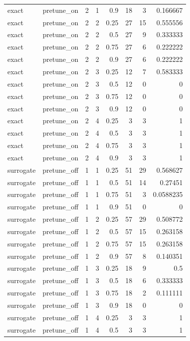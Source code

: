 \begin{table}[htbp]
\begin{tabular}{lrrrrrrr}
exact & pretune\_on & 2 & 1 & 0.9 & 18 & 3 & 0.166667 \\
exact & pretune\_on & 2 & 2 & 0.25 & 27 & 15 & 0.555556 \\
exact & pretune\_on & 2 & 2 & 0.5 & 27 & 9 & 0.333333 \\
exact & pretune\_on & 2 & 2 & 0.75 & 27 & 6 & 0.222222 \\
exact & pretune\_on & 2 & 2 & 0.9 & 27 & 6 & 0.222222 \\
exact & pretune\_on & 2 & 3 & 0.25 & 12 & 7 & 0.583333 \\
exact & pretune\_on & 2 & 3 & 0.5 & 12 & 0 & 0 \\
exact & pretune\_on & 2 & 3 & 0.75 & 12 & 0 & 0 \\
exact & pretune\_on & 2 & 3 & 0.9 & 12 & 0 & 0 \\
exact & pretune\_on & 2 & 4 & 0.25 & 3 & 3 & 1 \\
exact & pretune\_on & 2 & 4 & 0.5 & 3 & 3 & 1 \\
exact & pretune\_on & 2 & 4 & 0.75 & 3 & 3 & 1 \\
exact & pretune\_on & 2 & 4 & 0.9 & 3 & 3 & 1 \\
surrogate & pretune\_off & 1 & 1 & 0.25 & 51 & 29 & 0.568627 \\
surrogate & pretune\_off & 1 & 1 & 0.5 & 51 & 14 & 0.27451 \\
surrogate & pretune\_off & 1 & 1 & 0.75 & 51 & 3 & 0.0588235 \\
surrogate & pretune\_off & 1 & 1 & 0.9 & 51 & 0 & 0 \\
surrogate & pretune\_off & 1 & 2 & 0.25 & 57 & 29 & 0.508772 \\
surrogate & pretune\_off & 1 & 2 & 0.5 & 57 & 15 & 0.263158 \\
surrogate & pretune\_off & 1 & 2 & 0.75 & 57 & 15 & 0.263158 \\
surrogate & pretune\_off & 1 & 2 & 0.9 & 57 & 8 & 0.140351 \\
surrogate & pretune\_off & 1 & 3 & 0.25 & 18 & 9 & 0.5 \\
surrogate & pretune\_off & 1 & 3 & 0.5 & 18 & 6 & 0.333333 \\
surrogate & pretune\_off & 1 & 3 & 0.75 & 18 & 2 & 0.111111 \\
surrogate & pretune\_off & 1 & 3 & 0.9 & 18 & 0 & 0 \\
surrogate & pretune\_off & 1 & 4 & 0.25 & 3 & 3 & 1 \\
surrogate & pretune\_off & 1 & 4 & 0.5 & 3 & 3 & 1 \\

\end{tabular}
\end{table}
